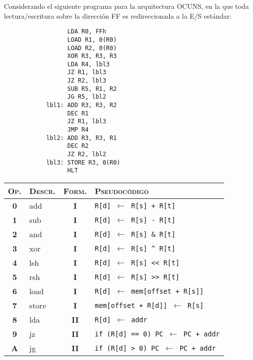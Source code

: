 \documentclass[12pt,a4paper]{article}
\begin{document}
 Considerando el siguiente programa para la arquitectura OCUNS, en la que toda lectura/escritura sobre la dirección FF es redireccionada a la E/S estándar: \\ [2.5mm]
\begin{small}
	\begin{minipage}{.4\textwidth}
		\begin{verbatim}
			      LDA R0, FFh
			      LOAD R1, 0(R0)
			      LOAD R2, 0(R0)
			      XOR R3, R3, R3
			      LDA R4, lbl3
			      JZ R1, lbl3
			      JZ R2, lbl3
			      SUB R5, R1, R2
			      JG R5, lbl2
			lbl1: ADD R3, R3, R2
			      DEC R1
			      JZ R1, lbl3
			      JMP R4
			lbl2: ADD R3, R3, R1
			      DEC R2
			      JZ R2, lbl2
			lbl3: STORE R3, 0(R0)
			      HLT
		\end{verbatim}
	\end{minipage}
	\begin{minipage}{.6\textwidth}	
		\begin{tabular}{|c|l|c|l|}\hline
			\textsc{Op.} & \textsc{Descr.} & \textsc{Form.} & \textsc{Pseudocódigo} \\ \hline
			\textbf{0} & \textsf{add} & \textbf{I} & \texttt{R[d] $\leftarrow$ R[s] + R[t]} \\
			\textbf{1} & \textsf{sub} & \textbf{I} & \texttt{R[d] $\leftarrow$ R[s] - R[t]} \\
			\textbf{2} & \textsf{and} & \textbf{I} & \texttt{R[d] $\leftarrow$ R[s] \& R[t]} \\
			\textbf{3} & \textsf{xor} & \textbf{I} & \texttt{R[d] $\leftarrow$ R[s] \^{} R[t]} \\
			\textbf{4} & \textsf{lsh} & \textbf{I} & \texttt{R[d] $\leftarrow$ R[s] <{}<{} R[t]} \\
			\textbf{5} & \textsf{rsh}  & \textbf{I} & \texttt{R[d] $\leftarrow$ R[s] >{}>{} R[t]} \\
			\textbf{6} & \textsf{load}  & \textbf{I} & \texttt{R[d] $\leftarrow$ mem[offset + R[s]]} \\
			\textbf{7} & \textsf{store} & \textbf{I} & \texttt{mem[offset + R[d]] $\leftarrow$ R[s]} \\
			\textbf{8} & \textsf{lda}   & \textbf{II} & \texttt{R[d] $\leftarrow$ addr} \\
			\textbf{9} & \textsf{jz}    & \textbf{II} & \texttt{if (R[d] == 0) PC $\leftarrow$ PC + addr} \\
			\textbf{A} & \textsf{jg}    & \textbf{II} & \texttt{if (R[d] >{} 0) PC $\leftarrow$ PC + addr} \\

\end{tabular}
\end{minipage}
\end{small}
\end{document}
